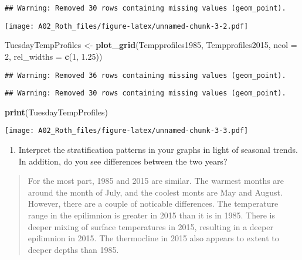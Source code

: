 \documentclass[]{article}
\newenvironment{Shaded}{\begin{snugshade}}{\end{snugshade}}
\newcommand{\DataTypeTok}[1]{\textcolor[rgb]{0.13,0.29,0.53}{#1}}
\newcommand{\DecValTok}[1]{\textcolor[rgb]{0.00,0.00,0.81}{#1}}
\newcommand{\FloatTok}[1]{\textcolor[rgb]{0.00,0.00,0.81}{#1}}
\newcommand{\KeywordTok}[1]{\textcolor[rgb]{0.13,0.29,0.53}{\textbf{#1}}}
\newcommand{\NormalTok}[1]{#1}
\newcommand{\StringTok}[1]{\textcolor[rgb]{0.31,0.60,0.02}{#1}}
\providecommand{\tightlist}{%
  \setlength{\itemsep}{0pt}\setlength{\parskip}{0pt}}
\begin{document}
\begin{verbatim}
## Warning: Removed 30 rows containing missing values (geom_point).
\end{verbatim}

\texttt{[image: A02\_Roth\_files/figure-latex/unnamed-chunk-3-2.pdf]}

\begin{Shaded}
\begin{Highlighting}[]
\NormalTok{TuesdayTempProfiles <-}\StringTok{ }
\StringTok{  }\KeywordTok{plot_grid}\NormalTok{(Tempprofiles1985, Tempprofiles2015, }
            \DataTypeTok{ncol =} \DecValTok{2}\NormalTok{,}
            \DataTypeTok{rel_widths =} \KeywordTok{c}\NormalTok{(}\DecValTok{1}\NormalTok{, }\FloatTok{1.25}\NormalTok{))}
\end{Highlighting}
\end{Shaded}

\begin{verbatim}
## Warning: Removed 36 rows containing missing values (geom_point).
\end{verbatim}

\begin{verbatim}
## Warning: Removed 30 rows containing missing values (geom_point).
\end{verbatim}

\begin{Shaded}
\begin{Highlighting}[]
\KeywordTok{print}\NormalTok{(TuesdayTempProfiles)}
\end{Highlighting}
\end{Shaded}

\texttt{[image: A02\_Roth\_files/figure-latex/unnamed-chunk-3-3.pdf]}

\begin{enumerate}
\def\labelenumi{\arabic{enumi}.}
\setcounter{enumi}{6}
\tightlist
\item
  Interpret the stratification patterns in your graphs in light of
  seasonal trends. In addition, do you see differences between the two
  years?
\end{enumerate}

\begin{quote}
For the most part, 1985 and 2015 are similar. The warmest months are
around the month of July, and the coolest monts are May and August.
However, there are a couple of noticable differences. The temperature
range in the epilimnion is greater in 2015 than it is in 1985. There is
deeper mixing of surface temperatures in 2015, resulting in a deeper
epilimnion in 2015. The thermocline in 2015 also appears to extent to
deeper depths than 1985.
\end{quote}
\end{document}
